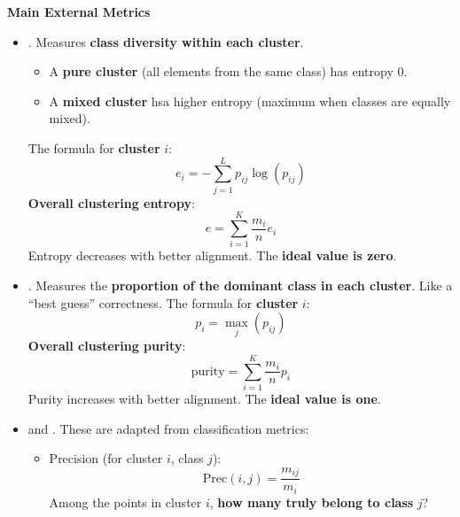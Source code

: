 \newpage

\begin{flushleft}
    \textcolor{Green3}{ \textbf{Main External Metrics}}
\end{flushleft}
\begin{itemize}
    \item {}. Measures \textbf{class diversity within each cluster}.
    \begin{itemize}
        \item A \textbf{pure cluster} (all elements from the same class) has entropy 0.
        \item A \textbf{mixed cluster} hsa higher entropy (maximum when classes are equally mixed).
    \end{itemize}
    The formula for \textbf{cluster} $i$:
    \begin{equation}
        e_{i} = -\displaystyle\sum_{j=1}^{L} p_{ij} \log\left(p_{ij}\right)
    \end{equation}
    \textbf{Overall clustering entropy}:
    \begin{equation}
        e = \displaystyle\sum_{i=1}^{K} \dfrac{m_{i}}{n} e_{i}
    \end{equation}
    Entropy decreases with better alignment. The \textbf{ideal value is zero}.


    \item {}. Measures the \textbf{proportion of the dominant class in each cluster}. Like a ``best guess'' correctness. The formula for \textbf{cluster} $i$:
    \begin{equation}
        p_{i} = \max_{j} \left(p_{ij}\right)
    \end{equation}
    \textbf{Overall clustering purity}:
    \begin{equation}
        \text{purity} = \displaystyle\sum_{i=1}^{K} \dfrac{m_{i}}{n} p_{i}
    \end{equation}
    Purity increases with better alignment. The \textbf{ideal value is one}.

    
    \item {} and . These are adapted from classification metrics:
    \begin{itemize}
        \item Precision (for cluster $i$, class $j$):
        \begin{equation}
            \text{Prec}\left(i,j\right) = \dfrac{m_{ij}}{m_{i}}
        \end{equation}
        Among the points in cluster $i$, \textbf{how many truly belong to class} $j$?


\end{itemize}
\end{itemize}
